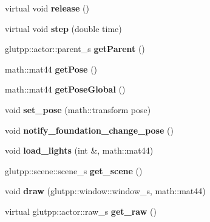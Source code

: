 \begin{DoxyCompactItemize}
\item 
\hypertarget{classglutpp_1_1actor_1_1actor_a3e31d7fa4231564b9b6c98d93c6a8d17}{virtual void {\bfseries release} ()}\label{classglutpp_1_1actor_1_1actor_a3e31d7fa4231564b9b6c98d93c6a8d17}

\item 
\hypertarget{classglutpp_1_1actor_1_1actor_ae264fd9182e417cc3d954e91f326f3af}{virtual void {\bfseries step} (double time)}\label{classglutpp_1_1actor_1_1actor_ae264fd9182e417cc3d954e91f326f3af}

\item 
\hypertarget{classglutpp_1_1actor_1_1actor_a0bc6eedd6edf5f24534d8b87c2da5de1}{glutpp\-::actor\-::parent\-\_\-s {\bfseries get\-Parent} ()}\label{classglutpp_1_1actor_1_1actor_a0bc6eedd6edf5f24534d8b87c2da5de1}

\item 
\hypertarget{classglutpp_1_1actor_1_1actor_a72e8f023672a73fcc6499fa0f2f42dbe}{math\-::mat44 {\bfseries get\-Pose} ()}\label{classglutpp_1_1actor_1_1actor_a72e8f023672a73fcc6499fa0f2f42dbe}

\item 
\hypertarget{classglutpp_1_1actor_1_1actor_a4629f61093831a4eb8853bcc57816be7}{math\-::mat44 {\bfseries get\-Pose\-Global} ()}\label{classglutpp_1_1actor_1_1actor_a4629f61093831a4eb8853bcc57816be7}

\item 
\hypertarget{classglutpp_1_1actor_1_1actor_a830d8f4bf43f3f436545e8b9ff73dac5}{void {\bfseries set\-\_\-pose} (math\-::transform pose)}\label{classglutpp_1_1actor_1_1actor_a830d8f4bf43f3f436545e8b9ff73dac5}

\item 
\hypertarget{classglutpp_1_1actor_1_1actor_a25274295ccfff15c00d9dcabc1dd6192}{void {\bfseries notify\-\_\-foundation\-\_\-change\-\_\-pose} ()}\label{classglutpp_1_1actor_1_1actor_a25274295ccfff15c00d9dcabc1dd6192}

\item 
\hypertarget{classglutpp_1_1actor_1_1actor_a77d1b7dc02d9b39398acff7422eb4b1d}{void {\bfseries load\-\_\-lights} (int \&, math\-::mat44)}\label{classglutpp_1_1actor_1_1actor_a77d1b7dc02d9b39398acff7422eb4b1d}

\item 
\hypertarget{classglutpp_1_1actor_1_1actor_ab16316902e38071888ce842da9c93436}{glutpp\-::scene\-::scene\-\_\-s {\bfseries get\-\_\-scene} ()}\label{classglutpp_1_1actor_1_1actor_ab16316902e38071888ce842da9c93436}

\item 
\hypertarget{classglutpp_1_1actor_1_1actor_a7079c42ff56468e9fe46aea22d929494}{void {\bfseries draw} (glutpp\-::window\-::window\-\_\-s, math\-::mat44)}\label{classglutpp_1_1actor_1_1actor_a7079c42ff56468e9fe46aea22d929494}

\item 
\hypertarget{classglutpp_1_1actor_1_1actor_aaaa1656e46cf18d003f6d08d3eb0d097}{virtual glutpp\-::actor\-::raw\-\_\-s {\bfseries get\-\_\-raw} ()}\label{classglutpp_1_1actor_1_1actor_aaaa1656e46cf18d003f6d08d3eb0d097}

\end{DoxyCompactItemize}
